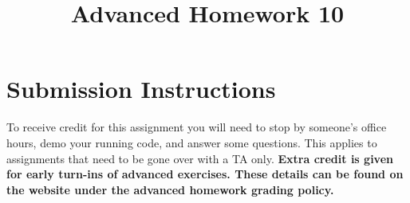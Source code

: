 \documentclass{article}
\begin{document}
\fancyfoot[C]{\color{gray} \thepage~/~\pageref*{LastPage}}
\pagestyle{fancyplain}

\title{\textbf{Advanced Homework 10\\}}
\author{\textbf{\color{red}{Due: Wednesday, November 22nd, 11:59PM (Hard Deadline)}}}
\date{}
\maketitle


\section*{Submission Instructions}
To receive credit for this assignment you will need to stop by someone's
office hours, demo your running code, and answer some questions. \textbf{\color{red}{Make sure
to check the office hour schedule as the real due date is at the last office
hours before the date listed above.}} This applies to assignments that need to be gone over with a TA only.
\textbf{Extra credit is given for early turn-ins of advanced exercises. These details can be found on the website under the advanced homework grading policy.}

\medskip
\end{document}
